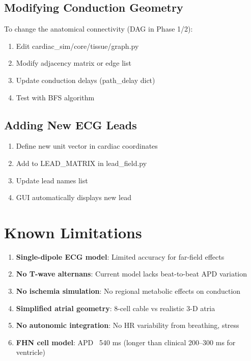 \documentclass[11pt, a4paper]{article}
\begin{document}
\subsection{Modifying Conduction Geometry}

To change the anatomical connectivity (DAG in Phase 1/2):

\begin{enumerate}
    \item Edit cardiac\_sim/core/tissue/graph.py
    \item Modify adjacency matrix or edge list
    \item Update conduction delays (path\_delay dict)
    \item Test with BFS algorithm
\end{enumerate}

\subsection{Adding New ECG Leads}

\begin{enumerate}
    \item Define new unit vector in cardiac coordinates
    \item Add to LEAD\_MATRIX in lead\_field.py
    \item Update lead names list
    \item GUI automatically displays new lead
\end{enumerate}

\section{Known Limitations}

\begin{enumerate}
    \item \textbf{Single-dipole ECG model}: Limited accuracy for far-field effects
    \item \textbf{No T-wave alternans}: Current model lacks beat-to-beat APD variation
    \item \textbf{No ischemia simulation}: No regional metabolic effects on conduction
    \item \textbf{Simplified atrial geometry}: 8-cell cable vs realistic 3-D atria
    \item \textbf{No autonomic integration}: No HR variability from breathing, stress
    \item \textbf{FHN cell model}: APD ~540 ms (longer than clinical 200--300 ms for ventricle)
\end{enumerate}
\end{document}
